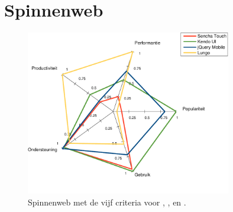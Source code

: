 \section{Spinnenweb}
\label{sec:evaluatie-spinnenweb}

\begin{figure}[H]
  \centering
  \includegraphics[width=0.8\textwidth]{figuren/spidergraph.pdf}
  \caption{Spinnenweb met de vijf criteria voor \st{},  \kendo{},  \jqm{} en \lungo{}.}
  \label{fig:spinnenweb}
\end{figure}